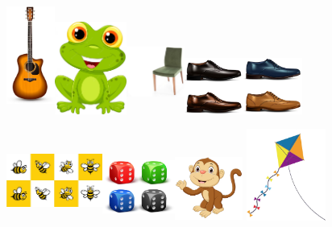 \includegraphics[width=0.62222in,height=1.51597in]{media/image9.png}\includegraphics[width=0.92986in,height=1.19236in]{media/image10.png}\includegraphics[width=0.74583in,height=1.09722in]{media/image11.png}\includegraphics[width=1.52708in,height=0.72014in]{media/image12.png}

\includegraphics[width=1.23958in,height=1.03019in]{media/image13.png}\includegraphics[width=0.93333in,height=0.87447in]{media/image14.png}\includegraphics[width=0.88403in,height=0.83253in]{media/image15.png}\includegraphics[width=1.11736in,height=1.18440in]{media/image16.png}

